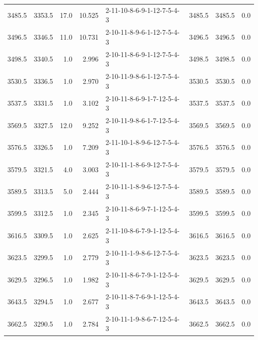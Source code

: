\begin{tabular}{rrrrlrrr}
 3485.5 &  3353.5 &           17.0 &             10.525 &  2-11-10-8-6-9-1-12-7-5-4-3 &        3485.5 &          3485.5 &       0.0 \\
 3496.5 &  3346.5 &           11.0 &             10.731 &  2-10-11-8-9-6-1-12-7-5-4-3 &        3496.5 &          3496.5 &       0.0 \\
 3498.5 &  3340.5 &            1.0 &              2.996 &  2-10-11-8-6-9-1-12-7-5-4-3 &        3498.5 &          3498.5 &       0.0 \\
 3530.5 &  3336.5 &            1.0 &              2.970 &  2-10-11-9-8-6-1-12-7-5-4-3 &        3530.5 &          3530.5 &       0.0 \\
 3537.5 &  3331.5 &            1.0 &              3.102 &  2-10-11-8-6-9-1-7-12-5-4-3 &        3537.5 &          3537.5 &       0.0 \\
 3569.5 &  3327.5 &           12.0 &              9.252 &  2-10-11-9-8-6-1-7-12-5-4-3 &        3569.5 &          3569.5 &       0.0 \\
 3576.5 &  3326.5 &            1.0 &              7.209 &  2-11-10-1-8-9-6-12-7-5-4-3 &        3576.5 &          3576.5 &       0.0 \\
 3579.5 &  3321.5 &            4.0 &              3.003 &  2-10-11-1-8-6-9-12-7-5-4-3 &        3579.5 &          3579.5 &       0.0 \\
 3589.5 &  3313.5 &            5.0 &              2.444 &  2-10-11-1-8-9-6-12-7-5-4-3 &        3589.5 &          3589.5 &       0.0 \\
 3599.5 &  3312.5 &            1.0 &              2.345 &  2-10-11-8-6-9-7-1-12-5-4-3 &        3599.5 &          3599.5 &       0.0 \\
 3616.5 &  3309.5 &            1.0 &              2.625 &  2-11-10-8-6-7-9-1-12-5-4-3 &        3616.5 &          3616.5 &       0.0 \\
 3623.5 &  3299.5 &            1.0 &              2.779 &  2-10-11-1-9-8-6-12-7-5-4-3 &        3623.5 &          3623.5 &       0.0 \\
 3629.5 &  3296.5 &            1.0 &              1.982 &  2-10-11-8-6-7-9-1-12-5-4-3 &        3629.5 &          3629.5 &       0.0 \\
 3643.5 &  3294.5 &            1.0 &              2.677 &  2-10-11-8-7-6-9-1-12-5-4-3 &        3643.5 &          3643.5 &       0.0 \\
 3662.5 &  3290.5 &            1.0 &              2.784 &  2-10-11-1-9-8-6-7-12-5-4-3 &        3662.5 &          3662.5 &       0.0 \\

\end{tabular}
